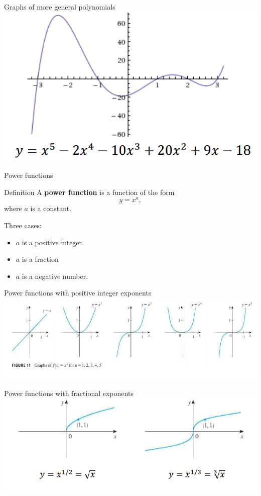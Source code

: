 \documentclass[t]{beamer}
\begin{document}
\begin{frame}{Graphs of more general polynomials}
\vfill
\includegraphics[width=\textwidth]{poly}
\vfill
\end{frame}

\begin{frame}{Power functions}
\begin{block}{Definition}
A \textbf{power function} is a function of the form
$$y = x^a,$$
where $a$ is a constant.
\end{block}
Three cases:
\begin{itemize}
\item $a$ is a positive integer.
\item $a$ is a fraction
\item $a$ is a negative number.
\end{itemize}
\end{frame}

\begin{frame}{Power functions with positive integer exponents}
\vfill
\includegraphics[width=\textwidth]{posint}
\vfill
\end{frame}

\begin{frame}{Power functions with fractional exponents}
\vfill
\includegraphics[width=\textwidth]{fraction}
\vfill
\end{frame}
\end{document}
